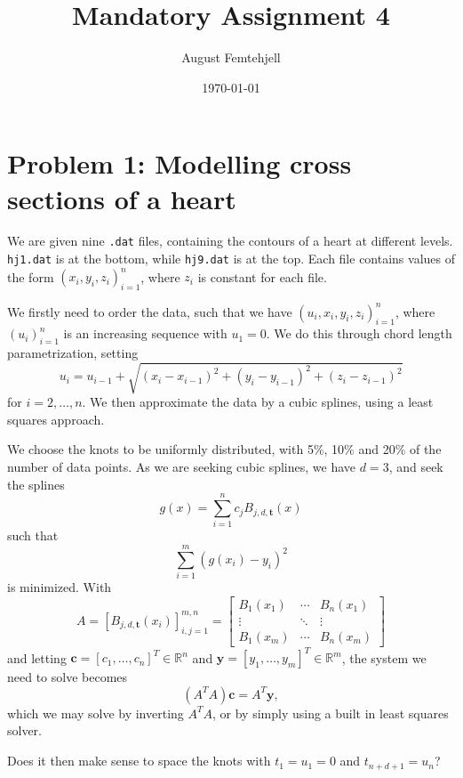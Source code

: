 \documentclass[a4paper,12pt]{article}
\title{Mandatory Assignment 4}
\author{August Femtehjell}
\date{\today}
\begin{document}
\maketitle

\section{Problem 1: Modelling cross sections of a heart}
We are given nine \verb|.dat| files, containing the contours of a heart at different levels.
\verb|hj1.dat| is at the bottom, while \verb|hj9.dat| is at the top.
Each file contains values of the form $(x_i, y_i, z_i)_{i = 1}^n$, where $z_i$ is constant for each file.

We firstly need to order the data, such that we have $(u_i, x_i, y_i, z_i)_{i = 1}^n$, where $(u_i)_{i = 1}^n$ is an increasing sequence with $u_1 = 0$.
We do this through chord length parametrization, setting
\begin{equation}
    u_i = u_{i - 1} + \sqrt{
        (x_i - x_{i - 1})^2 + (y_i - y_{i - 1})^2 + (z_i - z_{i - 1})^2
    }
\end{equation}
for $i = 2, \ldots, n$.
We then approximate the data by a cubic splines, using a least squares approach.

We choose the knots to be uniformly distributed, with 5\%, 10\% and 20\% of the number of data points.
As we are seeking cubic splines, we have $d = 3$, and seek the splines
\begin{equation}
    g(x) = \sum_{i = 1}^{n} c_j B_{j, d, \mathbf{t}}(x)
\end{equation}
such that
\begin{equation}
    \sum_{i = 1}^{m} \left( g(x_i) - y_i \right)^2
\end{equation}
is minimized.
With
\begin{equation}
    A
    = \left[ B_{j, d, \mathbf{t}}(x_i) \right]_{i,j = 1}^{m,n}
    =
    \begin{bmatrix}
        B_1(x_1) & \cdots & B_n(x_1) \\
        \vdots & \ddots & \vdots \\
        B_1(x_m) & \cdots & B_n(x_m)
    \end{bmatrix}
\end{equation}
and letting $\mathbf{c} = [c_1, \ldots, c_n]^T \in \mathbb{R}^n$ and $\mathbf{y} = [y_1, \ldots, y_m]^T \in \mathbb{R}^m$, the system we need to solve becomes
\begin{equation}
    (A^T A) \mathbf{c} = A^T \mathbf{y},
\end{equation}
which we may solve by inverting $A^T A$, or by simply using a built in least squares solver.

Does it then make sense to space the knots with $t_1 = u_1 = 0$ and $t_{n+d+1} = u_n$?
\end{document}
